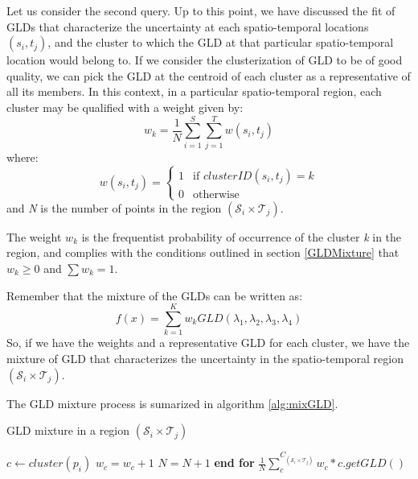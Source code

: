 Let us consider the second query. Up to this point, we have discussed the fit of GLDs that characterize the uncertainty at each spatio-temporal locations $(s_{i},t_{j})$, and the cluster to which the GLD at that particular spatio-temporal location would belong to. If we consider the clusterization of GLD to be of good quality, we can pick the GLD at the centroid of each cluster as a representative of all its members. In this context, in a particular spatio-temporal region, each cluster may be qualified with a weight given by:
\begin{equation}
w_{k}=\frac{1}{N}\sum_{i=1}^S \sum_{j=1}^T w(s_{i},t_{j})
\end{equation}
where:
\begin{equation}
  w(s_{i},t_{j}) =
  \begin{cases}
    1 & \text{if $clusterID(s_{i},t_{j}) = k$} \\
    0 & \text{otherwise}
  \end{cases}
\end{equation}
and  \textit{N} is the number of points in the region $(\mathcal{S}_{i} \times \mathcal{T}_{j})$.

The weight $w_k$ is the frequentist probability of occurrence of the cluster \textit{k} in the region, and complies with the conditions outlined in section \ref{GLDMixture} that $w_{k} \geq 0$ and $\sum w_{k}=1$.

Remember that the mixture of the GLDs can be written as:
\begin{equation}
f(x)=\sum_{k=1}^K w_{k}GLD(\lambda_{1},\lambda_{2},\lambda_{3},\lambda_{4})
\end{equation}
So, if we have the weights and a representative GLD for each cluster, we have the mixture of GLD that characterizes the uncertainty in the spatio-temporal region $(\mathcal{S}_{i} \times \mathcal{T}_{j})$.

The GLD mixture process is sumarized in algorithm \ref{alg:mixGLD}.

\begin{algorithm} 
\caption{GLD mixture in a region $(\mathcal{S}_{i} \times \mathcal{T}_{j})$}\label{alg:mixGLD}
\begin{algorithmic}[1] 
\State $c \gets cluster(p_i)$
\State $w_c= w_c+1$
\State $N=N+1$
\EndFor
\State \textbf{end for}
\State \Return $\frac{1}{N} \sum_{c}^{C_{(\mathcal{S}_{i} \times \mathcal{T}_{j})}} 
    w_{c} * c.getGLD()$
\EndFunction 
\end{algorithmic} 
\end{algorithm} 

